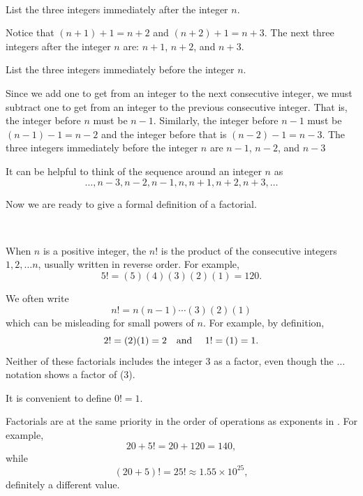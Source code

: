 \begin{exam} 
\label{exam_consecutive_integers}
~
        \begin{apart}
            \item List the three integers immediately after the integer $n$.
            \begin{soln}
                Notice that $(n+1)+1=n+2$ and $(n+2)+1 = n+3$. The next three integers after the integer $n$ are: $n+1$, $n+2$, and $n+3$.
            \end{soln}
            \item List the three integers immediately before the integer $n$.
            \begin{soln}
                Since we add one to get from an integer to the next consecutive integer, we must subtract one to get from an integer to the previous consecutive integer.  That is, the integer before $n$ must be $n-1$.  Similarly, the integer before $n-1$ must be $(n-1)-1=n-2$ and the integer before that is $(n-2)-1=n-3$.  The three integers immediately before the integer $n$ are $n-1$, $n-2$, and $n-3$
            \end{soln}
        \end{apart}
    \end{exam}
    
It can be helpful to think of the sequence around an integer $n$ as
$$\ldots, n-3, n-2, n-1, n, n+1, n+2, n+3, \ldots$$

Now we are ready to give a formal definition of a factorial. 

\begin{defn} [Factorial]
\label{defn_factorial}
~
    \begin{apart}
        \item \label{part_5factorial}
        When $n$ is a positive integer, the  $n!$ is the product of the consecutive integers $1, 2, \ldots n$, usually written in reverse order. For example, 
        $$5!=(5)(4)(3)(2)(1) = 120.$$
        \item We often write 
        $$n! = n(n-1)\cdots(3)(2)(1)$$
        which can be misleading for small powers of $n$. For example, by definition, $$2!=(2)(1) = 2 \text{\quad and \quad} 1!=(1) = 1.$$ Neither of these factorials includes the integer 3 as a factor, even though the $\ldots$ notation shows a factor of (3).
        \item It is convenient to define $0!=1$.
        \item Factorials are at the same priority in the order of operations as exponents in .  For example, 
             $$20+5! = 20 + 120 = 140,$$ while $$(20 +5)! = 25! \approx 1.55 \times 10^{25},$$
        definitely a different value.
    \end{apart}
\end{defn}

